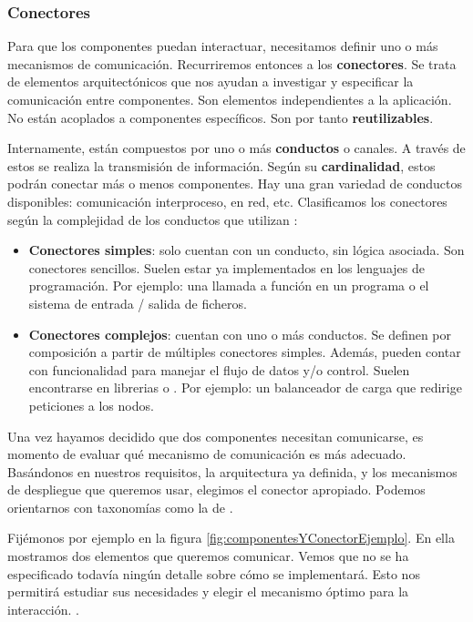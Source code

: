\subsubsection{Conectores}

Para que los componentes puedan interactuar, necesitamos definir uno o más mecanismos de comunicación. Recurriremos entonces a los \textbf{conectores}. Se trata de elementos arquitectónicos que nos ayudan a investigar y especificar la comunicación entre componentes. \cite{perryFoundationsStudySoftware1992} Son elementos independientes a la aplicación. No están acoplados a componentes específicos. Son por tanto \textbf{reutilizables}. \cite{taylorComponentMessagebasedArchitectural1996a}

Internamente, están compuestos por uno o más \textbf{conductos} o canales. A través de estos se realiza la transmisión de información. Según su \textbf{cardinalidad}, estos podrán conectar más o menos componentes. Hay una gran variedad de conductos disponibles: comunicación interproceso, en red, etc. Clasificamos los conectores según la complejidad de los conductos que utilizan \cite{mehtaTaxonomySoftwareConnectors2000}:

\begin{itemize}
    \item \textbf{Conectores simples}: solo cuentan con un conducto, sin lógica asociada. Son conectores sencillos. Suelen estar ya implementados en los lenguajes de programación. Por ejemplo: una llamada a función en un programa o el sistema de entrada / salida de ficheros.

    \item \textbf{Conectores complejos}: cuentan con uno o más conductos. Se definen por composición a partir de múltiples conectores simples. Además, pueden contar con funcionalidad para manejar el flujo de datos y/o control. Suelen encontrarse en librerias o . Por ejemplo: un balanceador de carga que redirige peticiones a los nodos.
\end{itemize}

Una vez hayamos decidido que dos componentes necesitan comunicarse, es momento de evaluar qué mecanismo de comunicación es más adecuado. Basándonos en nuestros requisitos, la arquitectura ya definida, y los mecanismos de despliegue que queremos usar, elegimos el conector apropiado. Podemos orientarnos con taxonomías como la de \cite{mehtaTaxonomySoftwareConnectors2000}.

Fijémonos por ejemplo en la figura \ref{fig:componentesYConectorEjemplo}. En ella mostramos dos elementos que queremos comunicar. Vemos que no se ha especificado todavía ningún detalle sobre cómo se implementará. Esto nos permitirá estudiar sus necesidades y elegir el mecanismo óptimo para la interacción. \cite{taylorSoftwareArchitectureFoundations2009}.

